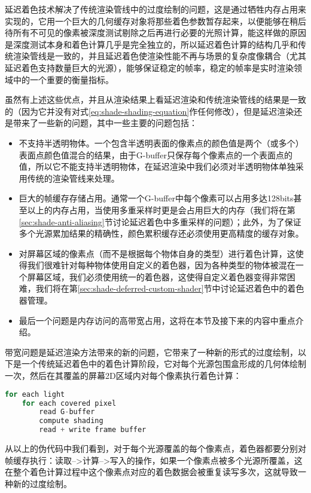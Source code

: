 延迟着色技术解决了传统渲染管线中的过度绘制的问题，这是通过牺牲内存占用来实现的，它用一个巨大的几何缓存对象将那些着色参数暂存起来，以便能够在稍后待所有不可见的像素被深度测试剔除之后再进行必要的光照计算，能这样做的原因是深度测试本身和着色计算几乎是完全独立的，所以延迟着色计算的结构几乎和传统渲染管线是一致的，并且延迟着色使渲染性能不再与场景的复杂度像耦合（尤其延迟着色支持数量巨大的光源），能够保证稳定的帧率，稳定的帧率是实时渲染领域中的一个重要的衡量指标。

虽然有上述这些优点，并且从渲染结果上看延迟渲染和传统渲染管线的结果是一致的（因为它并没有对式\ref{eq:shade-shading-equation}作任何修改），但是延迟渲染还是带来了一些新的问题，其中一些主要的问题包括：

\begin{itemize}
	\item 不支持半透明物体。一个包含半透明表面的像素点的颜色值是两个（或多个）表面点颜色值混合的结果，由于G-buffer只保存每个像素点的一个表面点的值，所以它不能支持半透明物体，在延迟渲染中我们必须对半透明物体单独采用传统的渲染管线来处理。
	\item 巨大的帧缓存存储占用。通常一个G-buffer中每个像素可以占用多达128bits甚至以上的内存占用，当使用多重采样时更是会占用巨大的内存（我们将在第\ref{sec:shade-anti-aliasing}节讨论延迟着色中多重采样的问题）；此外，为了保证多个光源累加结果的精确性，颜色累积缓存还必须使用更高精度的缓存对象。
	\item 对屏幕区域的像素点（而不是根据每个物体自身的类型）进行着色计算，这使得我们很难针对每种物体使用自定义的着色器，因为各种类型的物体被混在一个屏幕区域，我们必须使用统一的着色器，这使得自定义着色器变得非常困难，我们将在第\ref{sec:shade-deferred-custom-shader}节中讨论延迟着色中的着色器管理。
	\item 最后一个问题是内存访问的高带宽占用，这将在本节及接下来的内容中重点介绍。
\end{itemize}

带宽问题是延迟渲染方法带来的新的问题，它带来了一种新的形式的过度绘制，以下是一个传统延迟着色中的着色计算阶段，它对每个光源包围盒形成的几何体绘制一次，然后在其覆盖的屏幕2D区域内对每个像素执行着色计算：

\begin{lstlisting}[language=C++]
for each light
	for each covered pixel
		read G-buffer
		compute shading
		read + write frame buffer
\end{lstlisting}

从以上的伪代码中我们看到，对于每个光源覆盖的每个像素点，着色器都要分别对帧缓存执行：读取-->计算-->写入的操作，如果一个像素点被多个光源所覆盖，这在整个着色计算过程中这个像素点对应的着色数据会被重复读写多次，这就导致一种新的过度绘制。

